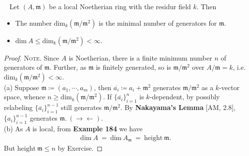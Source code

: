 \documentclass[12pt,a4paper,footinclude=true,headinclude=true]{scrbook} %
\newenvironment{proposition}[2][]
{\renewcommand\theinnercustomprop{#2}\innercustomprop[#1] 
\begin{mdframed}[backgroundcolor=gray!20]\ }
{\end{mdframed}\endinnercustomprop}
\begin{document}
\begin{proposition}{204}
    Let $(A,\mathfrak{m})$ be a local Noetherian ring with the residur field $k$. Then
    \begin{itemize}
        \item[(a)] The number $\mathrm{dim}_k(\mathfrak{m}/\mathfrak{m}^2)$ is the minimal number of generators for $\mathfrak{m}$.
        \item[(b)] $\mathrm{dim}\ A\leq\mathrm{dim}_k(\mathfrak{m}/\mathfrak{m}^2)<\infty$.
    \end{itemize}
\end{proposition}
\begin{proof}
    \textsc{Note.} Since $A$ is Noetherian, there is a finite minimum number $n$ of generators of $\mathfrak{m}$. Further, as $\mathfrak{m}$ is finitely generated, so is  $\mathfrak{m}/\mathfrak{m}^2$ over $A/\mathfrak{m}=k$, i.e. $\mathrm{dim}_k(\mathfrak{m}/\mathfrak{m}^2)<\infty$.\\
    (a) Suppose $\mathfrak{m}\coloneqq(a_1,\cdots,a_m)$, then $\overline{a_i}\coloneqq a_i+\mathfrak{m}^2$ generates $\mathfrak{m}/\mathfrak{m}^2$ as a $k$-vector space, whence $n\geq\mathrm{dim}_k(\mathfrak{m}/\mathfrak{m}^2)$. If $\{\overline{a_i}\}_{i=1}^n$ is $k$-dependent, by possibly relabeling $\{\overline{a_i}\}_{i=1}^{n-1}$ still generates $\mathfrak{m}/\mathfrak{m}^2$. By \textbf{Nakayama's Lemma} [AM, 2.8], $\{a_i\}_{i=1}^{n-1}$ generates $\mathfrak{m}.\ (\to\gets)$.\\ 
    (b) As $A$ is local, from \textbf{Example 184} we have
    \begin{align*}
        \mathrm{dim}\ A\ =\ \mathrm{dim}\ A_\mathfrak{m}\ =\ \mathrm{height}\ \mathfrak{m}.
    \end{align*}
    But $\mathrm{height}\ \mathfrak{m}\leq n$ by Exercise.
\end{proof}
\end{document}
